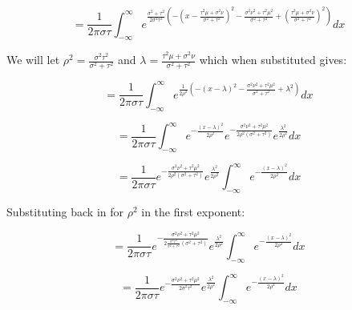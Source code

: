\documentclass{article}
\begin{document}
\begin{equation}
    = \frac{1}{2\pi\sigma\tau} \int_{-\infty}^\infty e^{\frac{\sigma^2+\tau^2}{2\sigma^2\tau^2} \left(
    -\left(x - \frac{\tau^2 \mu + \sigma^2 \nu}{\sigma^2+\tau^2}\right)^2
    - \frac{\sigma^2 \nu^2 + \tau^2 \mu^2}{\sigma^2+\tau^2}
    + \left(\frac{ \tau^2 \mu + \sigma^2 \nu }{\sigma^2 + \tau^2}\right)^2
    \right)} dx
\end{equation}

We will let $\rho^2=\frac{\sigma^2\tau^2}{\sigma^2+\tau^2}$ and $\lambda=\frac{\tau^2 \mu + \sigma^2 \nu}{\sigma^2+\tau^2}$ which when substituted gives:

\begin{equation}
    = \frac{1}{2\pi\sigma\tau} \int_{-\infty}^\infty e^{\frac{1}{2 \rho^2} \left(
    -\left(x - \lambda \right)^2
    - \frac{\sigma^2 \nu^2 + \tau^2 \mu^2}{\sigma^2+\tau^2}
    + \lambda^2
    \right)} dx
\end{equation}

\begin{equation}
    = \frac{1}{2\pi\sigma\tau} \int_{-\infty}^\infty e^{-\frac{(x - \lambda)^2}{2 \rho^2}}
    e^{-\frac{\sigma^2 \nu^2 + \tau^2 \mu^2}{2\rho^2\left(\sigma^2+\tau^2\right)}}
    e^{\frac{\lambda^2}{2\rho^2}} dx
\end{equation}

\begin{equation}
    = \frac{1}{2\pi\sigma\tau} e^{-\frac{\sigma^2 \nu^2 + \tau^2 \mu^2}{2\rho^2\left(\sigma^2+\tau^2\right)}}
    e^{\frac{\lambda^2}{2\rho^2}} \int_{-\infty}^\infty e^{-\frac{(x - \lambda)^2}{2 \rho^2}}
     dx
\end{equation}

Substituting back in for $\rho^2$ in the first exponent:

\begin{equation}
    = \frac{1}{2\pi\sigma\tau} e^{-\frac{\sigma^2 \nu^2 + \tau^2 \mu^2}{2\frac{\sigma^2\tau^2}{\sigma^2+\tau^2}\left(\sigma^2+\tau^2\right)}}
    e^{\frac{\lambda^2}{2\rho^2}} \int_{-\infty}^\infty e^{-\frac{(x - \lambda)^2}{2 \rho^2}}
     dx
\end{equation}

\begin{equation}
    = \frac{1}{2\pi\sigma\tau} e^{-\frac{\sigma^2 \nu^2 + \tau^2 \mu^2}{2\sigma^2\tau^2}}
    e^{\frac{\lambda^2}{2\rho^2}} \int_{-\infty}^\infty e^{-\frac{(x - \lambda)^2}{2 \rho^2}}
     dx
\end{equation}
\end{document}

